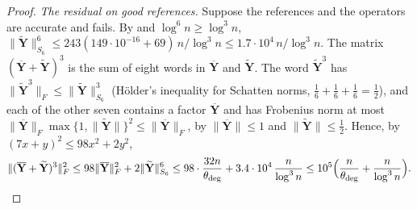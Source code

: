 \documentclass[11pt]{article}
\theoremstyle{remark}
\newcommand{\YY}{\mathbf{Y}}
\newcommand{\YYbar}{{\overline{\YY}}}
\newcommand{\YYtil}{{\widetilde{\YY}}}
\newcommand{\dheavy}{\theta_{\deg}}
\newcommand{\norm}[1]{\lVert#1\rVert}
\begin{document}
\begin{proof}
\emph{The residual on good references.}
Suppose the references and the operators are accurate and
 fails.
By  and $\log^{6}n\ge\log^{3}n$,
$\norm{\YYtil}_{S_6}^{6}\le243(149\cdot10^{-16}+69)\,n/\log^{3}n\le1.7\cdot10^{4}\,n/\log^{3}n$.
The matrix $(\YYbar+\YYtil)^{3}$ is the sum of eight words in $\YYbar$ and
$\YYtil$.
The word $\YYtil^{3}$ has $\norm{\YYtil^{3}}_F\le\norm{\YYtil}_{S_6}^{3}$
(H\"older's inequality for Schatten norms, $\frac16+\frac16+\frac16=\frac12$),
and each of the other seven contains a factor $\YYbar$ and has Frobenius
norm at most $\norm{\YYbar}_F\max\{1,\norm{\YYtil}\}^{2}\le\norm{\YYbar}_F$,
by $\norm{\YYbar}\le1$ and $\norm{\YYtil}\le\frac12$.
Hence, by $(7x+y)^{2}\le98x^{2}+2y^{2}$,
\begin{equation}\label{eq:resbound}
\norm{(\YYbar+\YYtil)^{3}}_F^{2}
\le98\norm{\YYbar}_F^{2}+2\norm{\YYtil}_{S_6}^{6}
\le98\cdot\frac{32n}{\dheavy}+3.4\cdot10^{4}\,\frac{n}{\log^{3}n}
\le10^{5}\Bigl(\frac n{\dheavy}+\frac n{\log^{3}n}\Bigr).
\end{equation}


\end{proof}
\end{document}
